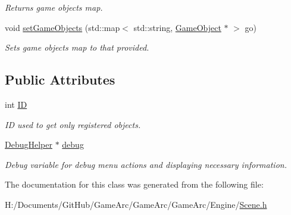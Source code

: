 \begin{DoxyCompactItemize}
\begin{DoxyCompactList}\small\item\em Returns game objects map. \end{DoxyCompactList}\item 
\hypertarget{class_scene_a9a1bad34e21edf3eda7fe8183c034b9c}{void \hyperlink{class_scene_a9a1bad34e21edf3eda7fe8183c034b9c}{set\+Game\+Objects} (std\+::map$<$ std\+::string, \hyperlink{class_game_object}{Game\+Object} $\ast$ $>$ go)}\label{class_scene_a9a1bad34e21edf3eda7fe8183c034b9c}

\begin{DoxyCompactList}\small\item\em Sets game objects map to that provided. \end{DoxyCompactList}\end{DoxyCompactItemize}
\subsection*{Public Attributes}
\begin{DoxyCompactItemize}
\item 
\hypertarget{class_scene_ac1e7daf8385257c261a212b3b34d7e28}{int \hyperlink{class_scene_ac1e7daf8385257c261a212b3b34d7e28}{I\+D}}\label{class_scene_ac1e7daf8385257c261a212b3b34d7e28}

\begin{DoxyCompactList}\small\item\em I\+D used to get only registered objects. \end{DoxyCompactList}\item 
\hypertarget{class_scene_abb41eda003d71ee80315ab9f5da5848e}{\hyperlink{class_debug_helper}{Debug\+Helper} $\ast$ \hyperlink{class_scene_abb41eda003d71ee80315ab9f5da5848e}{debug}}\label{class_scene_abb41eda003d71ee80315ab9f5da5848e}

\begin{DoxyCompactList}\small\item\em Debug variable for debug menu actions and displaying necessary information. \end{DoxyCompactList}\end{DoxyCompactItemize}


The documentation for this class was generated from the following file\+:\begin{DoxyCompactItemize}
\item 
H\+:/\+Documents/\+Git\+Hub/\+Game\+Arc/\+Game\+Arc/\+Game\+Arc/\+Engine/\hyperlink{_scene_8h}{Scene.\+h}\end{DoxyCompactItemize}
